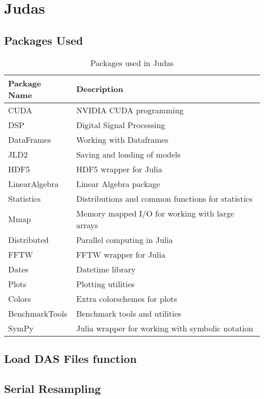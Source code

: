 \chapter{Judas}
\label{app:judas}


\section{Packages Used}
\label{app:jupacks}

\begin{table}[!h]
\centering
\caption{Packages used in Judas}
\label{tab:judas-packages}
\small
\begin{tabular}{>{\raggedright\arraybackslash}p{}>{\raggedright\arraybackslash}p{}}
\toprule
\textbf{Package Name} & \textbf{Description} \\
\midrule
CUDA & NVIDIA CUDA programming \\
\rowcolor{gray!10} DSP & Digital Signal Processing \\
DataFrames & Working with Dataframes \\
\rowcolor{gray!10} JLD2 & Saving and loading of models \\
HDF5 & HDF5 wrapper for Julia \\
\rowcolor{gray!10} LinearAlgebra & Linear Algebra package \\
Statistics & Distributions and common functions for statistics\\
\rowcolor{gray!10} Mmap & Memory mapped I/O for working with large arrays \\
Distributed & Parallel computing in Julia \\
\rowcolor{gray!10} FFTW & FFTW wrapper for Julia \\
Dates & Datetime library \\
\rowcolor{gray!10} Plots & Plotting utilities \\
Colors & Extra colorschemes for plots \\
\rowcolor{gray!10} BenchmarkTools & Benchmark tools and utilities \\
SymPy & Julia wrapper for working with symbolic notation \\
\bottomrule
\end{tabular}
\end{table}

\section{Load DAS Files function}
\label{app:loaddas}



\section{Serial Resampling}
